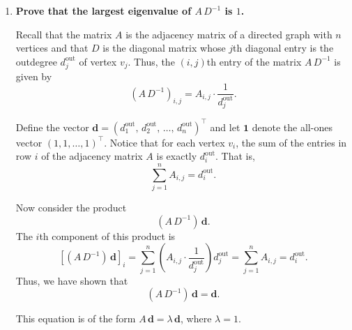 \documentclass[a4paper,12pt]{article}
\begin{document}
\begin{enumerate}
\medskip

\textbf{Why is convergence of the series important?} \\[1mm]
The Neumann series
\[
I + \alpha M + (\alpha M)^2 + (\alpha M)^3 + \cdots
\]
provides a way to compute the inverse \((I - \alpha M)^{-1}\). If this series converges, then the inverse exists in a meaningful sense and the partial sums of the series approach a finite limit. This ensures that the computed PageRank centrality vector \(\mathbf{C}_p\) will have finite, well-defined values.

On the other hand, if the series does not converge (i.e., if \(\rho(\alpha M) \ge 1\)), then the partial sums will either grow without bound or fail to settle to any fixed number. In that case, the inverse \((I - \alpha M)^{-1}\) cannot be represented by the series, and the resulting PageRank centrality values would diverge (or be undefined), meaning they would not be finite.

\bigskip

\item \textbf{Prove that the largest eigenvalue of \(A\,D^{-1}\) is \(1\).}

Recall that the matrix \(A\) is the adjacency matrix of a directed graph with \(n\) vertices and that \(D\) is the diagonal matrix whose \(j\)th diagonal entry is the outdegree \(d_j^{\mathrm{out}}\) of vertex \(v_j\).  Thus, the \((i,j)\)th entry of the matrix \(A\,D^{-1}\) is given by
\[
\left(A\,D^{-1}\right)_{i,j} = A_{i,j}\cdot\frac{1}{d_j^{\mathrm{out}}}.
\]

Define the vector \(\mathbf{d} = (d_1^{\mathrm{out}},\,d_2^{\mathrm{out}},\,\dots,\,d_n^{\mathrm{out}})^\top\) and let \(\mathbf{1}\) denote the all-ones vector \((1,1,\dots,1)^\top\). Notice that for each vertex \(v_i\), the sum of the entries in row \(i\) of the adjacency matrix \(A\) is exactly \(d_i^{\mathrm{out}}\). That is,
\[
\sum_{j=1}^n A_{i,j} = d_i^{\mathrm{out}}.
\]

Now consider the product
\[
(A\,D^{-1})\,\mathbf{d}.
\]
The \(i\)th component of this product is
\[
\left[(A\,D^{-1})\,\mathbf{d}\right]_i = \sum_{j=1}^n \left(A_{i,j}\cdot\frac{1}{d_j^{\mathrm{out}}}\right)d_j^{\mathrm{out}}
= \sum_{j=1}^n A_{i,j} = d_i^{\mathrm{out}}.
\]
Thus, we have shown that
\[
(A\,D^{-1})\,\mathbf{d} = \mathbf{d}.
\]


This equation is of the form \(A\,\mathbf{d} = \lambda\,\mathbf{d}\), where \(\lambda = 1\).


\end{enumerate}
\end{document}
